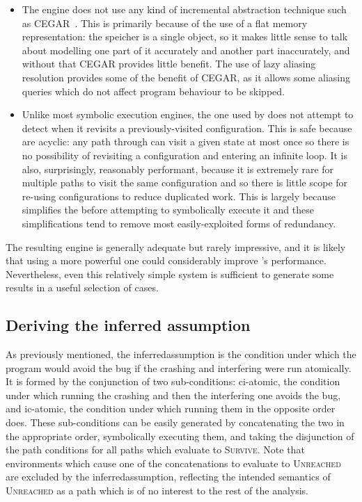 \begin{itemize}
\item The engine does not use any kind of incremental abstraction
  technique such as CEGAR~\cite{Clarke2003}.  This is primarily
  because of the use of a flat memory representation: the speicher is
  a single object, so it makes little sense to talk about modelling
  one part of it accurately and another part inaccurately, and without
  that CEGAR provides little benefit.  The use of lazy aliasing
  resolution provides some of the benefit of CEGAR, as it allows some
  aliasing queries which do not affect program behaviour to be
  skipped.

\item Unlike most symbolic execution engines, the one used by
  {\implementation} does not attempt to detect when it revisits a
  previously-visited configuration.  This is safe because
  {\StateMachines} are acyclic: any path through {\AStateMachine} can
  visit a given state at most once so there is no possibility of
  revisiting a configuration and entering an infinite loop.  It is
  also, surprisingly, reasonably performant, because it is extremely
  rare for multiple paths to visit the same configuration and so there
  is little scope for re-using configurations to reduce duplicated
  work.  This is largely because {\technique} simplifies the
  {\StateMachine} before attempting to symbolically execute it and
  these simplifications tend to remove most easily-exploited forms of
  redundancy.
\end{itemize}
The resulting engine is generally adequate but rarely impressive, and
it is likely that using a more powerful one could considerably improve
{\implementation}'s performance.  Nevertheless, even this relatively
simple system is sufficient to generate some results in a useful
selection of cases.

\subsection{Deriving the inferred assumption}
\label{sect:derive:inferred_assumption}

As previously mentioned, the \gls{inferredassumption} is the condition
under which the program would avoid the bug if the crashing and
interfering {\StateMachines} were run atomically.  It is formed by the
conjunction of two sub-conditions: \gls{ci-atomic}, the condition
under which running the crashing {\StateMachine} and then the
interfering one avoids the bug, and \gls{ic-atomic}, the condition
under which running them in the opposite order does.  These
sub-conditions can be easily generated by concatenating the two
{\StateMachines} in the appropriate order, symbolically executing
them, and taking the disjunction of the path conditions for all paths
which evaluate to \textsc{Survive}.  Note that {\StateMachine}
environments which cause one of the concatenations to evaluate to
\textsc{Unreached} are excluded by the \gls{inferredassumption},
reflecting the intended semantics of \textsc{Unreached} as a path
which is of no interest to the rest of the analysis.

